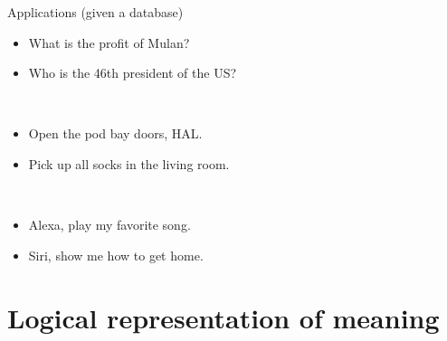 \documentclass[usenames,dvipsnames,notes]{beamer}
\begin{document}
\begin{frame}
    {Applications}
     (given a database)\\
    \begin{itemize}
        \item[] What is the profit of Mulan? 
        \item[] Who is the 46th president of the US?
    \end{itemize}

    \\
    \begin{itemize}
        \item[] Open the pod bay doors, HAL.
        \item[] Pick up all socks in the living room. 
    \end{itemize}

    \\
    \begin{itemize}
        \item[] Alexa, play my favorite song.
        \item[] Siri, show me how to get home.
    \end{itemize}
\end{frame}

\section{Logical representation of meaning}
\end{document}
